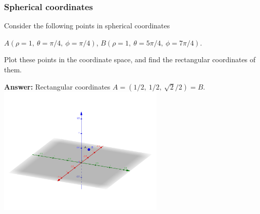 \documentclass[10pt]{beamer}
\begin{document}
\begin{frame}
\frametitle{Spherical coordinates}
\begin{example}
Consider the following points in spherical coordinates
\begin{center}
$A(\rho=1,\ \theta=\pi/4,\ \phi=\pi/4)$, $B(\rho=1,\ \theta=5\pi/4,\ \phi=7\pi/4)$.
\end{center}
Plot these points in the coordinate space, and find the rectangular coordinates of them.\pause
\end{example}
{\bf Answer:} Rectangular coordinates $A = (1/2,\ 1/2,\ \sqrt 2/2) = B$.
\centering
\includegraphics[width = 0.6\textwidth]{spheripoints.png}
\end{frame}
\end{document}
